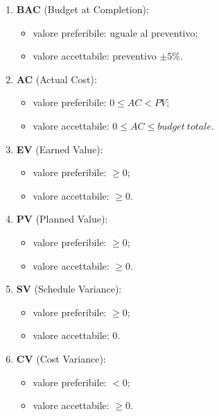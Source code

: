                 \begin{enumerate}
                    \item \textbf{BAC} (Budget at Completion):
                    \begin{itemize}
                        \item valore preferibile: uguale al preventivo;
                        \item valore accettabile: preventivo $\pm 5\%$.
                    \end{itemize}
                    \item \textbf{AC} (Actual Cost):
                    \begin{itemize}
                        \item valore preferibile: $0 \leq AC < PV$;
                        \item valore accettabile: $0 \leq AC \leq budget\ totale$.
                    \end{itemize}
                    \item \textbf{EV} (Earned Value):
                    \begin{itemize}
                        \item valore preferibile: $\geq 0$;
                        \item valore accettabile: $\geq 0$.
                    \end{itemize}
                    \item \textbf{PV} (Planned Value):
                    \begin{itemize}
                        \item valore preferibile: $\geq 0$;
                        \item valore accettabile: $\geq 0$.
                    \end{itemize}
                    \item \textbf{SV} (Schedule Variance):
                    \begin{itemize}
                        \item valore preferibile: $\geq 0$;
                        \item valore accettabile: $0$.
                    \end{itemize}
                    \item \textbf{CV} (Cost Variance):
                    \begin{itemize}
                        \item valore preferibile: $< 0$;
                        \item valore accettabile: $\geq 0$.
                    \end{itemize}
                \end{enumerate}
